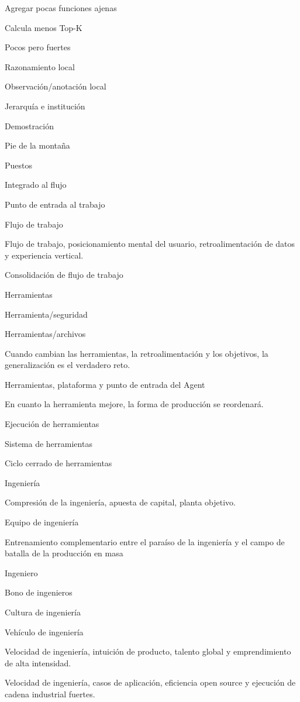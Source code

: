 \documentclass{article}
\begin{document}
Agregar pocas funciones ajenas

Calcula menos Top-K

Pocos pero fuertes

Razonamiento local

Observación/anotación local

Jerarquía e institución

Demostración

Pie de la montaña

Puestos

Integrado al flujo

Punto de entrada al trabajo

Flujo de trabajo

Flujo de trabajo, posicionamiento mental del usuario, retroalimentación de datos y experiencia vertical.

Consolidación de flujo de trabajo

Herramientas

Herramienta/seguridad

Herramientas/archivos

Cuando cambian las herramientas, la retroalimentación y los objetivos, la generalización es el verdadero reto.

Herramientas, plataforma y punto de entrada del Agent

En cuanto la herramienta mejore, la forma de producción se reordenará.

Ejecución de herramientas

Sistema de herramientas

Ciclo cerrado de herramientas

Ingeniería

Compresión de la ingeniería, apuesta de capital, planta objetivo.

Equipo de ingeniería

Entrenamiento complementario entre el paraíso de la ingeniería y el campo de batalla de la producción en masa

Ingeniero

Bono de ingenieros

Cultura de ingeniería

Vehículo de ingeniería

Velocidad de ingeniería, intuición de producto, talento global y emprendimiento de alta intensidad.

Velocidad de ingeniería, casos de aplicación, eficiencia open source y ejecución de cadena industrial fuertes.
\end{document}
